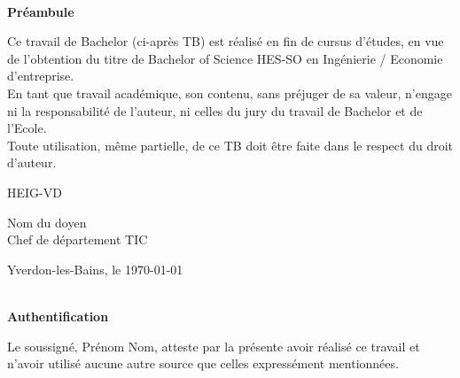 \documentclass[a4paper,12pt]{report}
\begin{document}
\pagebreak

\textsc{\Large }\\[3cm]
\begin{center}
    {\huge \bfseries Préambule}
    \vspace{1cm}
\end{center}

\noindent Ce travail de Bachelor (ci-après TB) est réalisé en fin de cursus d’études, en vue de l'obtention du titre de Bachelor of Science HES-SO en {\color{red} Ingénierie / Economie d’entreprise}. \\

\noindent En tant que travail académique, son contenu, sans préjuger de sa valeur, n'engage ni la responsabilité de l'auteur, ni celles du jury du travail de Bachelor et de l'Ecole. \\

\noindent Toute utilisation, même partielle, de ce TB doit être faite dans le respect du droit d’auteur. \\


\begin{flushright}
    \begin{minipage}{7cm}
        \vspace{2cm}
        HEIG-VD \\

        \vspace{2cm}

        Nom du doyen\\
        Chef de département TIC
    \end{minipage}\hfill
\end{flushright}

\vspace{3cm}

Yverdon-les-Bains, le \today

\pagebreak


\begin{center}
    \textsc{\Large }\\[3cm]
    {\huge \bfseries Authentification}

    \vspace{1cm}
\end{center}

\noindent Le soussigné, {\color{gray} Prénom Nom}, atteste par la présente avoir réalisé  ce travail et n’avoir utilisé aucune autre source que celles expressément mentionnées.

\vspace{2cm}
\end{document}
